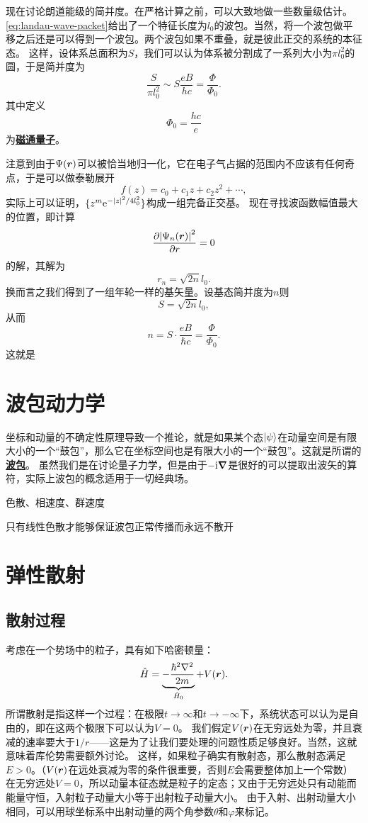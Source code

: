 \documentclass[UTF8, a4paper]{ctexart}
\newcommand*{\ee}{\mathrm{e}}
\newcommand*{\ii}{\mathrm{i}}
\newcommand{\concept}[1]{\underline{\textbf{#1}}}
\begin{document}
现在讨论朗道能级的简并度。在严格计算之前，可以大致地做一些数量级估计。
\eqref{eq:landau-wave-packet}给出了一个特征长度为$l_0$的波包。当然，将一个波包做平移之后还是可以得到一个波包。两个波包如果不重叠，就是彼此正交的系统的本征态。
这样，设体系总面积为$S$，我们可以认为体系被分割成了一系列大小为$\pi l_0^2$的圆，于是简并度为
\[
    \frac{S}{\pi l_0^2} \sim S \frac{eB}{h c} = \frac{\Phi}{\Phi_0}.
\]
其中定义
\begin{equation}
    \Phi_0 = \frac{h c}{e}
\end{equation}
为\concept{磁通量子}。

注意到由于$\Psi(\vb*{r})$可以被恰当地归一化，它在电子气占据的范围内不应该有任何奇点，于是可以做泰勒展开
\[
    f(z) = c_0 + c_1 z + c_2 z^2 + \cdots,
\]
实际上可以证明，$\{z^m \ee^{- \abs{z}^2 / 4 l_0^2}\}$构成一组完备正交基。
现在寻找波函数幅值最大的位置，即计算
\[
    \pdv{\abs{\Psi_n(\vb*{r})}^2}{r} = 0
\]
的解，其解为
\[
    r_n = \sqrt{2n} l_0.
\]
换而言之我们得到了一组年轮一样的基矢量。设基态简并度为$n$则
\[
    S = \sqrt{2n} l_0,
\]
从而
\[
    n = S \cdot \frac{eB}{\hbar c} = \frac{\Phi}{\Phi_0}.
\]
这就是

\section{波包动力学}

坐标和动量的不确定性原理导致一个推论，就是如果某个态$\ket{\psi}$在动量空间是有限大小的一个“鼓包”，那么它在坐标空间也是有限大小的一个“鼓包”。这就是所谓的\concept{波包}。
虽然我们是在讨论量子力学，但是由于$- \ii \grad$是很好的可以提取出波矢的算符，实际上波包的概念适用于一切经典场。

色散、相速度、群速度

只有线性色散才能够保证波包正常传播而永远不散开

\section{弹性散射}

\subsection{散射过程}

考虑在一个势场中的粒子，具有如下哈密顿量：
\begin{equation}
    \hat{H} = \underbrace{- \frac{\hbar^2 \laplacian}{2m}}_{\hat{H}_0} + V(\vb*{r}).
\end{equation}
所谓散射是指这样一个过程：在极限$t\to \infty$和$t \to -\infty$下，系统状态可以认为是自由的，即在这两个极限下可以认为$V=0$。
我们假定$V(\vb*{r})$在无穷远处为零，并且衰减的速率要大于$1/r$——这是为了让我们要处理的问题性质足够良好。当然，这就意味着库伦势需要额外讨论。
这样，如果粒子确实有散射态，那么散射态满足$E > 0$。（$V(\vb*{r})$在远处衰减为零的条件很重要，否则$E$会需要整体加上一个常数）
在无穷远处$V=0$，所以动量本征态就是粒子的定态；又由于无穷远处只有动能而能量守恒，入射粒子动量大小等于出射粒子动量大小。
由于入射、出射动量大小相同，可以用球坐标系中出射动量的两个角参数$\theta$和$\varphi$来标记。
\end{document}
